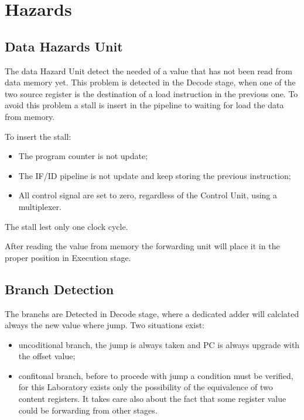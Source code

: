 %
\chapter{Hazards}
\label{cha4}

\section{Data Hazards Unit}

The data Hazard Unit detect the needed of a value that has not been read from 
data memory yet. This problem is detected in the Decode stage, when one of the 
two source register is the destination of a load instruction in the previous one. 
To avoid this problem a stall is insert in the pipeline to waiting for load the data 
from memory. 

To insert the stall:
\begin{itemize}
    \item The program counter is not update;
    \item The IF/ID pipeline is not update and keep storing the previous instruction;
    \item All control signal are set to zero, regardless of the Control Unit, using a multiplexer.
\end{itemize}
The stall lest only one clock cycle.

After reading the value from memory the forwarding unit will place it in the proper 
position in Execution stage.

\section{Branch Detection}

The branchs are Detected in Decode stage, where a dedicated adder will calclated always the new value where jump.
Two situations exist:
\begin{itemize}
    \item uncoditional branch, the jump is always taken and PC is always upgrade with the offset value;
    \item confitonal branch, before to procede with jump a condition must be verified, for this Laboratory
     exists only the possibility of the equivalence of two content registers. It takes care also about the fact that
     some register value could be forwarding from other stages. 
\end{itemize}

